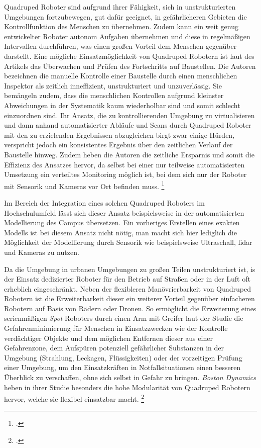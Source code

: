 Quadruped Roboter sind aufgrund ihrer Fähigkeit, sich in unstrukturierten Umgebungen fortzubewegen, gut dafür geeignet,
in gefährlicheren Gebieten die Kontrollfunktion des Menschen zu übernehmen.
Zudem kann ein weit genug entwickelter Roboter autonom Aufgaben übernehmen und diese in regelmäßigen Intervallen durchführen,
was einen großen Vorteil dem Menschen gegenüber darstellt.
Eine mögliche Einsatzmöglichkeit von Quadruped Robotern ist laut des Artikels  das Überwachen und
Prüfen des Fortschritts auf Baustellen.
Die Autoren bezeichnen die manuelle Kontrolle einer Baustelle durch einen menschlichen Inspektor als zeitlich inneffizient,
unstrukturiert und unzuverlässig.
Sie bemängeln zudem, dass die menschlichen Kontrollen aufgrund kleinster Abweichungen in der Systematik kaum wiederholbar sind
und somit schlecht einzuordnen sind.
Ihr Ansatz, die zu kontrollierenden Umgebung zu virtualisieren und dann anhand automatisierter Abläufe und Scans durch
Quadruped Roboter mit den zu erzielenden Ergebnissen abzugleichen birgt zwar einige Hürden, verspricht jedoch
ein konsistentes Ergebnis über den zeitlichen Verlauf der Baustelle hinweg.
Zudem heben die Autoren die zeitliche Ersparnis und somit die Effizienz des Ansatzes hervor, da selbst bei einer nur teilweise
automatisierten Umsetzung ein verteiltes Monitoring möglich ist, bei dem sich nur der Roboter mit Sensorik und Kameras vor Ort befinden muss.
\footcite{construction_quadruped}

Im Bereich der Integration eines solchen Quadruped Roboters im Hochschulumfeld lässt sich dieser Ansatz beispielsweise
in der automatisierten Modellierung des Campus übersetzen.
Ein vorheriges Erstellen eines exakten Modells ist bei diesem Ansatz nicht nötig, man macht sich hier lediglich die 
Möglichkeit der Modellierung durch Sensorik wie beispielsweise Ultraschall, \gls{lidar} und Kameras zu nutzen.


Da die Umgebung in urbanen Umgebungen zu großen Teilen unstrukturiert ist, is der Einsatz dedizierter Roboter für den
Betrieb auf Straßen oder in der Luft oft erheblich eingeschränkt.
Neben der flexibleren Manövrierbarkeit von Quadruped Robotern ist die Erweiterbarkeit
dieser ein weiterer Vorteil gegenüber einfacheren Robotern auf Basis von Rädern oder Dronen.
So ermöglicht die Erweiterung eines serienmäßigen \emph{Spot} Roboters durch einen Arm mit Greifer laut der Studie
 die Gefahrenminimierung für Menschen in Einsatzzwecken wie der Kontrolle verdächtiger Objekte und dem
möglichen Entfernen dieser aus einer Gefahrenzone, dem Aufspüren potenziell gefährlicher Substanzen in der Umgebung (Strahlung, Leckagen, Flüssigkeiten)
oder der vorzeitigen Prüfung einer Umgebung, um den Einsatzkräften in Notfallsituationen einen besseren Überblick zu verschaffen,
ohne sich selbst in Gefahr zu bringen.
\emph{Boston Dynamics} heben in ihrer Studie besonders die hohe Modularität von Quadruped Robotern hervor, welche sie
flexibel einsatzbar macht.
\footcite{boston_dynamics_safety}

